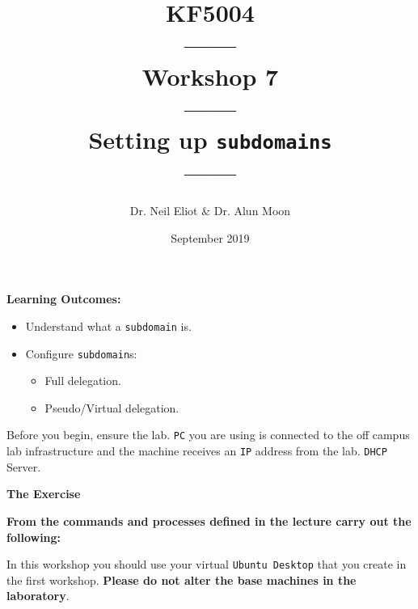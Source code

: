 \documentclass[11pt]{article}
\begin{document}
\author{Dr. Neil Eliot \& Dr. Alun Moon}
\title{KF5004\\------\\Workshop 7\\------\\Setting up \texttt{subdomains}\\------}
\date{September 2019}
\maketitle

\newpage



\noindent\textbf{Learning Outcomes:}
\begin{itemize}
    \item Understand what a \texttt{subdomain} is.
    \item Configure \texttt{subdomain}s:
        \begin{itemize}
            \item Full delegation.
            \item Pseudo/Virtual delegation.
        \end{itemize}
\end{itemize}


\begin{tcolorbox}[title={\textbf{Important:}}]
    Before you begin, ensure the lab. \texttt{PC} you are using is connected to the off campus lab infrastructure and the machine receives an \texttt{IP} address from the lab. \texttt{DHCP} Server.
\end{tcolorbox}
\newpage

\noindent\textbf{The Exercise}\\
\begin{tcolorbox}[colback=blue!20]
    \noindent\textbf{From the commands and processes defined in the lecture carry out the following:}
\end{tcolorbox}


\begin{tcolorbox}[title={\textbf{NOTE:}}]
    In this workshop you should use your virtual \texttt{Ubuntu Desktop} that you create in the first workshop. \textbf{Please do not alter the base machines in the laboratory}.
\end{tcolorbox}
\end{document}
